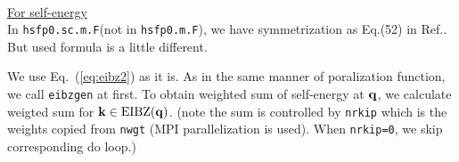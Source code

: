 \documentclass[a4paper,10pt,fleqn]{article}
\newcommand{\bfq}{{\bf q}}
\newcommand{\bfk}{{\bf k}}
\newcommand{\req}[1]{\mbox{Eq.~(\ref{#1})}}
\begin{document}

\ \\
\noindent \underline{For self-energy}\\
In \verb#hsfp0.sc.m.F#(not in \verb#hsfp0.m.F#), we have symmetrization
as Eq.(52) in Ref.\cite{friedrich_efficient_2010}. 
But used formula is a little different. 

We use \req{eq:eibz2} as it is.
As in the same manner of poralization function, we call \verb#eibzgen#
at first. To obtain weighted sum of self-energy at $\bfq$,
we calculate weigted sum for $\bfk \in {\rm EIBZ(\bfq)}$.
(note the sum is controlled by \verb#nrkip# which is the weights copied
from \verb#nwgt# (MPI parallelization is used). When \verb#nrkip=0#, we
skip corresponding do loop.)
\end{document}
